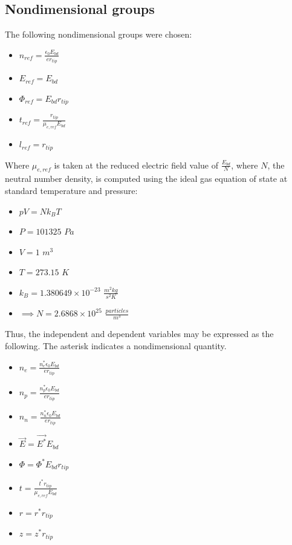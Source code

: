 \documentclass[12pt, a4paper]{report}
\begin{document}
\subsection{Nondimensional groups}
The following nondimensional groups were chosen:

\begin{itemize}
    \item $n_{ref} = \frac{\epsilon_0 E_{bd}}{e r_{tip}}$
    \item $E_{ref} = E_{bd}$
    \item $\Phi_{ref} = E_{bd}r_{tip}$
    \item $t_{ref} = \frac{r_{tip}}{\mu_{e,ref} E_{bd}}$
    \item $l_{ref} = r_{tip}$
\end{itemize}

Where $\mu_{e,ref}$ is taken at the reduced electric field value of $\frac{E_{bd}}{N}$, where $N$, the neutral number density, is computed using the ideal gas equation of state at standard temperature and pressure:

\begin{itemize}
    \item $pV = Nk_BT$
    \item $P = 101325$ $Pa$
    \item $V=1$ $m^3$
    \item $T = 273.15$ $K$
    \item $k_B = 1.380649\times 10 ^{-23}$ $\frac{m^2kg}{s^{2} K}$
    \item $\implies N = 2.6868 \times 10 ^{25}$ $\frac{particles}{m^3}$
\end{itemize}

\noindent
Thus, the independent and dependent variables may be expressed as the following. The asterisk indicates a nondimensional quantity.

\begin{itemize}
    \item $n_e = \frac{n^*_e \epsilon_0 E_{bd}}{e r_{tip}}$
    \item $n_p = \frac{n^*_p \epsilon_0 E_{bd}}{e r_{tip}}$
    \item $n_n = \frac{n^*_n \epsilon_0 E_{bd}}{e r_{tip}}$
    \item $\vec{E} = \vec{E^*}E_{bd}$
    \item $\Phi = \Phi^* E_{bd} r_{tip}$
    \item $t = \frac{t^*r_{tip}}{\mu_{e,ref} E_{bd}}$
    \item $r = r^*r_{tip}$
    \item $z = z^*r_{tip}$
\end{itemize}
\end{document}
